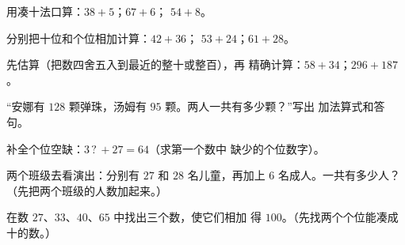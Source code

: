 \begin{exercise}[$\star$]\label{exo:g2:addition:4}
用凑十法口算：$38 + 5$；\quad $67 + 6$；
\quad $54 + 8$。
\end{exercise}

\begin{exercise}[$\star$]\label{exo:g2:addition:5}
分别把十位和个位相加计算：$42 + 36$；\quad
$53 + 24$；\quad $61 + 28$。
\end{exercise}

\begin{exercise}[$\star$]\label{exo:g2:addition:6}
先估算（把数四舍五入到最近的整十或整百），再
精确计算：$58 + 34$；\quad $296 + 187$。
\end{exercise}

\begin{exercise}[$\star$]\label{exo:g2:addition:7}
“安娜有 $128$ 颗弹珠，汤姆有 $95$ 颗。两人一共有多少颗？”写出
加法算式和答句。
\end{exercise}

\begin{exercise}[$\star$]\label{exo:g2:addition:8}
补全个位空缺：$3\,?\, + 27 = 64$（求第一个数中
缺少的个位数字）。
\end{exercise}

\begin{exercise}[$\star$]\label{exo:g2:addition:9}
两个班级去看演出：分别有 $27$ 和 $28$ 名儿童，再加上 $6$
名成人。一共有多少人？（先把两个班级的人数加起来。）
\end{exercise}

\begin{exercise}[$\star\star$]\label{exo:g2:addition:10}
在数 $27$、$33$、$40$、$65$ 中找出三个数，使它们相加
得 $100$。（先找两个个位能凑成十的数。）
\end{exercise}
